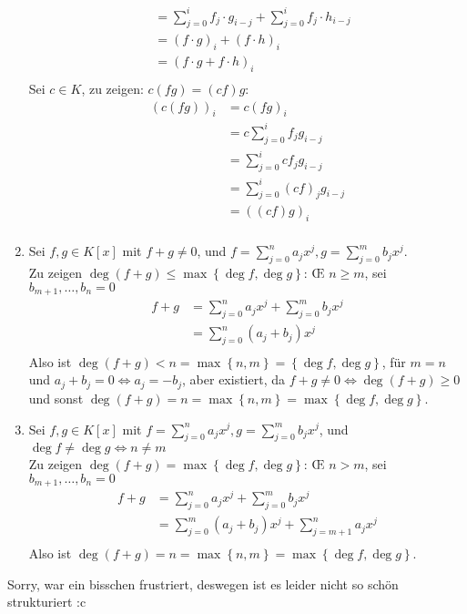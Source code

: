 \documentclass[sectionformat = aufgabe]{gadsescript}
\begin{document}
\begin{enumerate}[label=(\alph*)]
\begin{align*}
			&= \sum_{j=0}^{i} f_j \cdot g_{i - j} + \sum_{j=0}^{i} f_j \cdot  h_{i - j} \\
			&= (f \cdot  g)_i + (f \cdot h)_i \\
			&= (f \cdot  g + f \cdot h)_i \\
		\end{align*}
		Sei $ c \in K $, zu zeigen: $ c(fg) = (cf)g $:
		\begin{align*}
			(c(fg))_i &= c (fg)_i \\
			&= c \sum_{j=0}^{i} f_j g_{i - j}  \\
			&= \sum_{j=0}^{i} c f_j g_{i - j}  \\
			&= \sum_{j=0}^{i} (c f)_j g_{i - j}  \\
			&= ((cf)g)_i \\
		\end{align*}
	\item Sei $ f, g \in K[x] $ mit $ f + g \neq 0 $, und $ f = \sum_{j=0}^{n} a_j x^j, g = \sum_{j=0}^{m} b_j x^j $.\\
		Zu zeigen $ \deg (f + g) \leq \max \left\{ \deg f, \deg g \right\}  $:
		\OE{} $ n \geq m $, sei $ b_{m+1}, \dotsc, b_n = 0 $
		\begin{align*}
			f + g &= \sum_{j=0}^{n} a_j x^j + \sum_{j=0}^{m} b_j x^j \\
			&= \sum_{j=0}^{n} (a_j + b_j)x^j \\
		\end{align*}
		Also ist $ \deg(f + g) < n = \max \left\{ n, m \right\} = \left\{ \deg f, \deg g \right\}  $, für $ m = n $ und $ a_j + b_j = 0 \iff a_j = - b_j $, aber existiert, da $ f + g \neq 0 \iff \deg(f + g) \geq 0 $
		und sonst $ \deg(f + g) = n = \max \left\{ n, m \right\} = \max \left\{ \deg f, \deg g \right\}  $.
		
	\item Sei $ f, g \in K[x] $ mit $ f = \sum_{j=0}^{n} a_j x^j, g = \sum_{j=0}^{m} b_j x^j $, und $ \deg f \neq \deg g \iff n \neq m $\\
		Zu zeigen $ \deg (f + g) = \max \left\{ \deg f, \deg g \right\}  $:
		\OE{} $ n > m $, sei $ b_{m+1}, \dotsc, b_n = 0 $
		\begin{align*}
			f + g &= \sum_{j=0}^{n} a_j x^j + \sum_{j=0}^{m} b_j x^j \\
			&= \sum_{j=0}^{m} (a_j + b_j)x^j + \sum_{j=m+1}^{n} a_jx^j \\
		\end{align*}
		Also ist $ \deg(f + g) = n = \max \left\{ n, m \right\} = \max \left\{ \deg f, \deg g \right\}  $.
\end{enumerate}

\vspace{2cm}

Sorry, war ein bisschen frustriert, deswegen ist es leider nicht so schön strukturiert :c
\end{document}
